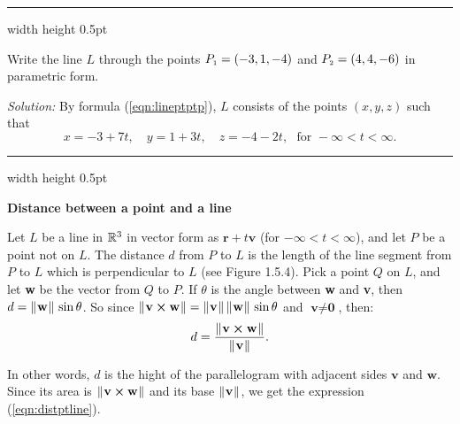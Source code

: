 \vspace{3mm}
\hrule width \textwidth height 0.5pt
\begin{exmp}\label{exmp:linethrupts}
 Write the line $L$ through the points $P_{\scriptscriptstyle 1} = (-3,1,-4)$ and $P_{\scriptscriptstyle 2} = (4,4,-6)$ in parametric
 form.\vspace{1mm}
 \par\noindent\emph{Solution:} By formula (\ref{eqn:lineptptp}), $L$ consists of the points $(x,y,z)$ such that
 \begin{displaymath}
  x = -3 + 7t, \quad y = 1 +3t, \quad z = -4 -2t, \text{~~for~} -\infty < t < \infty.
 \end{displaymath}
\end{exmp}\vspace{-1mm}
\hrule width \textwidth height 0.5pt
\vspace{2mm}

\par\noindent\textbf{\large{Distance between a point and a line}}\normalsize\vspace{1.5mm}

\piccaption[]{}
Let $L$ be a line in $\mathbb{R}^{3}$ in vector form as $\textbf{r} + t \textbf{v}$ (for $-\infty < t < \infty$), and
let $P$ be a point not on $L$. The distance $d$ from $P$ to $L$ is the length
of the line segment from $P$ to $L$ which is perpendicular to $L$ (see Figure 1.5.4).
Pick a point $Q$ on $L$, and let \textbf{w} be the vector from $Q$ to $P$. If $\theta$ is the angle between \textbf{w}
and \textbf{v}, then $d = \lVert\mspace{1mu}\textbf{w}\mspace{1mu}\rVert\,\sin \theta$. So since
$\lVert\mspace{1mu}\textbf{v} \bm{\times} \textbf{w}\mspace{1mu}\rVert = \lVert\mspace{1mu}\textbf{v}\mspace{1mu}\rVert\,\lVert\mspace{1mu}\textbf{w}\mspace{1mu}\rVert\,\sin \theta$ and
$\textbf{v} \ne \textbf{0}$, then:
\begin{equation}\label{eqn:distptline}
 d = \frac{\lVert\mspace{1mu}\textbf{v} \bm{\times} \textbf{w}\mspace{1mu}\rVert}{\lVert\mspace{1mu}\textbf{v}\mspace{1mu}\rVert}.
\end{equation}

In other words, $d$ is the hight of the parallelogram with adjacent sides $\textbf{v}$ and $\textbf{w}$.
Since its area is $\lVert\mspace{1mu}\textbf{v} \bm{\times} \textbf{w}\mspace{1mu}\rVert$ 
and its base $\lVert\mspace{1mu}\textbf{v}\mspace{1mu}\rVert$, we get the expression (\ref{eqn:distptline}).

